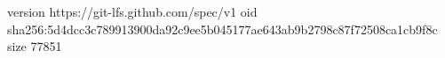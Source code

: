 version https://git-lfs.github.com/spec/v1
oid sha256:5d4dcc3c789913900da92c9ee5b045177ae643ab9b2798c87f72508ca1cb9f8c
size 77851
